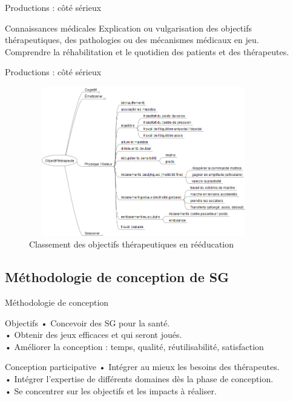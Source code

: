 \documentclass{beamer}
\begin{document}
		\begin{frame}{Productions : côté sérieux}
			\begin{block}{Connaissances médicales}
			Explication ou vulgarisation des objectifs thérapeutiques, des pathologies ou des mécanismes médicaux en jeu.\\
			Comprendre la réhabilitation et le quotidien des patients et des thérapeutes.
			\end{block}
		\end{frame}	
		
		\begin{frame}{Productions : côté sérieux}
			\begin{figure}
			\includegraphics[width=10cm, height=6.5cm]{../images/objectifs_moteurs.png}
			\caption{Classement des objectifs thérapeutiques en rééducation}
			\end{figure}
		\end{frame}
			
		\subsection{Méthodologie de conception de SG}
		\begin{frame}{Méthodologie de conception}
			\begin{exampleblock}{Objectifs}
				• Concevoir des SG pour la santé.\\ \pause
				• Obtenir des jeux efficaces et qui seront joués.\\ \pause
				• Améliorer la conception : temps, qualité, réutilisabilité, satisfaction 
			\end{exampleblock} \pause
			\begin{alertblock}{Conception participative}
				• Intégrer au mieux les besoins des thérapeutes.\\
				• Intégrer l'expertise de différents domaines dès la phase de conception.\\
				• Se concentrer sur les objectifs et les impacts à réaliser.
			\end{alertblock}
		\end{frame}			
		
\end{document}
